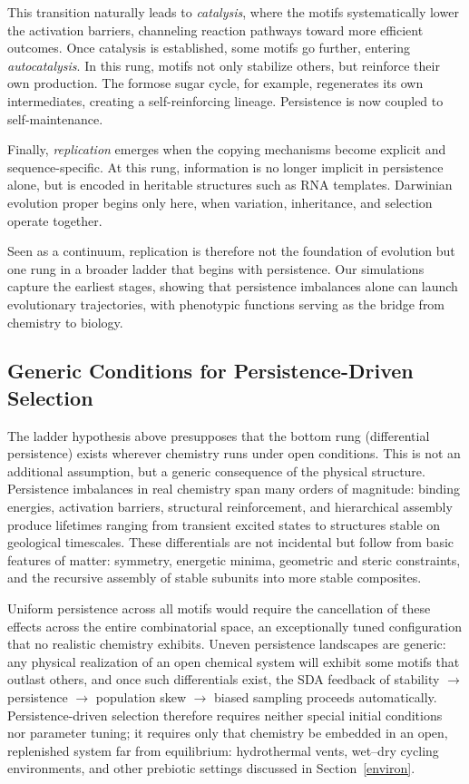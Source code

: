 \documentclass{artificial-life}
\let\cite\citep
\begin{document}
This transition naturally leads to \emph{catalysis}, where the motifs systematically lower the activation barriers, channeling reaction pathways toward more efficient outcomes. Once catalysis is established, some motifs go further, entering \emph{autocatalysis}. In this rung, motifs not only stabilize others, but reinforce their own production. The formose sugar cycle, for example, regenerates its own intermediates, creating a self-reinforcing lineage. Persistence is now coupled to self-maintenance.  

Finally, \emph{replication} \cite{england2013statphys} emerges when the copying mechanisms become explicit and sequence-specific. At this rung, information is no longer implicit in persistence alone, but is encoded in heritable structures such as RNA templates. Darwinian evolution proper begins only here, when variation, inheritance, and selection operate together.  

Seen as a continuum, replication is therefore not the foundation of evolution but one rung in a broader ladder that begins with persistence. Our simulations capture the earliest stages, showing that persistence imbalances alone can launch evolutionary trajectories, with phenotypic functions serving as the bridge from chemistry to biology.

\subsection{Generic Conditions for Persistence-Driven Selection}\label{sec:generic}

The ladder hypothesis above presupposes that the bottom rung (differential persistence) exists wherever chemistry runs under open conditions. This is not an additional assumption, but a generic consequence of the physical structure. Persistence imbalances in real chemistry span many orders of magnitude: binding energies, activation barriers, structural reinforcement, and hierarchical assembly produce lifetimes ranging from transient excited states to structures stable on geological timescales. These differentials are not incidental but follow from basic features of matter: symmetry, energetic minima, geometric and steric constraints, and the recursive assembly of stable subunits into more stable composites.

Uniform persistence across all motifs would require the cancellation of these effects across the entire combinatorial space, an exceptionally tuned configuration that no realistic chemistry exhibits. Uneven persistence landscapes are generic: any physical realization of an open chemical system will exhibit some motifs that outlast others, and once such differentials exist, the SDA feedback of stability $\to$ persistence $\to$ population skew $\to$ biased sampling proceeds automatically. Persistence-driven selection therefore requires neither special initial conditions nor parameter tuning; it requires only that chemistry be embedded in an open, replenished system far from equilibrium: hydrothermal vents, wet--dry cycling environments, and other prebiotic settings discussed in Section~\ref{environ}.
\end{document}
